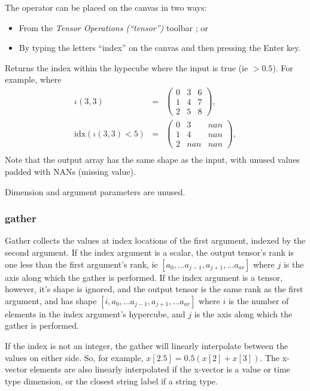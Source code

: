 The operator can be placed on the canvas in two ways:
\begin{itemize}
\item From the \emph{Tensor Operations (``tensor'')} toolbar ;
or 
\item By typing the letters ``index'' on the canvas and then pressing the
Enter key.
\end{itemize}
Returns the index within the hypecube where the input is true (ie
$>0.5$). For example, where 
\begin{eqnarray*}
\iota(3,3) & = & \left(\begin{array}{ccc}
0 & 3 & 6\\
1 & 4 & 7\\
2 & 5 & 8
\end{array}\right),\\
\mathrm{idx}(\iota(3,3)<5) & = & \left(\begin{array}{ccc}
0 & 3 & nan\\
1 & 4 & nan\\
2 & nan & nan
\end{array}\right),\\
\end{eqnarray*}
Note that the output array has the same shape as the input, with unused
values padded with NANs (missing value).

Dimension and argument parameters are unused.

\subsubsection{gather}

\label{Operation:gather}


Gather collects the values at index locations of the first argument, indexed by the second
argument. If the index argument is a scalar, the output tensor's rank
is one less than the first argument's rank, ie 
$[a_0,\ldots a_{j-1},a_{j+1},\ldots a_{ar}]$ where $j$ is the axis
along which the gather is performed. If the index argument is a
tensor, however, it's shape is ignored, and the output tensor is the
same rank as the first argument, and has shape
$[i, a_0,\ldots a_{j-1},a_{j+1},\ldots a_{ar}]$ where
$i$ is the number of elements in the index argument's hypercube, and $j$ is the axis along which the gather is performed.

If the index is not an integer, the gather will linearly interpolate
between the values on either side. So, for example,
$x[2.5] = 0.5 (x[2]+x[3])$. The x-vector elements are also linearly
interpolated if the x-vector is a value or time type dimension, or the
closest string label if a string type.

